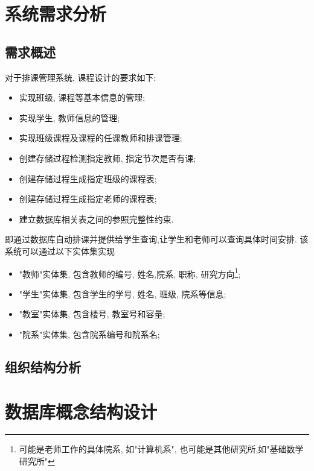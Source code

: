 \documentclass{myreport}
\begin{document}
\maketitle

\newpage
\tableofcontents
\newpage

\section{系统需求分析}
  \subsection{需求概述}
    对于排课管理系统, 课程设计的要求如下:
    \begin{itemize}
      \item 实现班级, 课程等基本信息的管理;
      \item 实现学生, 教师信息的管理;
      \item 实现班级课程及课程的任课教师和排课管理;
      \item 创建存储过程检测指定教师, 指定节次是否有课;
      \item 创建存储过程生成指定班级的课程表;
      \item 创建存储过程生成指定老师的课程表;
      \item 建立数据库相关表之间的参照完整性约束.
    \end{itemize}

    即通过数据库自动排课并提供给学生查询,让学生和老师可以查询具体时间安排.
    该系统可以通过以下实体集实现
    \begin{itemize}
      \item "教师"实体集, 包含教师的编号, 姓名,院系, 职称, 研究方向\footnote{可能是老师工作的具体院系, 如"计算机系", 也可能是其他研究所,如"基础数学研究所"};
      \item "学生"实体集, 包含学生的学号, 姓名, 班级, 院系等信息;
      \item "教室"实体集, 包含楼号, 教室号和容量;
      \item "院系"实体集, 包含院系编号和院系名;

    \end{itemize}

  \subsection{组织结构分析}
        

\section{数据库概念结构设计}
\end{document}
